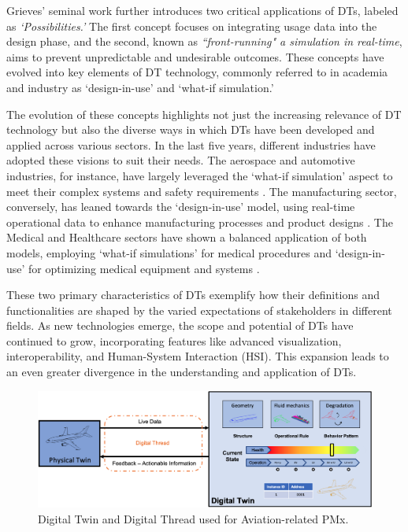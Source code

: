 \documentclass[runningheads]{llncs}
\begin{document}
Grieves' seminal work further introduces two critical applications of DTs, labeled as \textit{`Possibilities.'} The first concept focuses on integrating usage data into the design phase, and the second, known as \textit{``front-running" a simulation in real-time}, aims to prevent unpredictable and undesirable outcomes. These concepts have evolved into key elements of DT technology, commonly referred to in academia and industry as `design-in-use' and `what-if simulation.'

The evolution of these concepts highlights not just the increasing relevance of DT technology but also the diverse ways in which DTs have been developed and applied across various sectors. In the last five years, different industries have adopted these visions to suit their needs. The aerospace and automotive industries, for instance, have largely leveraged the `what-if simulation' aspect to meet their complex systems and safety requirements \cite{ezhilarasu2019management}. The manufacturing sector, conversely, has leaned towards the `design-in-use' model, using real-time operational data to enhance manufacturing processes and product designs \cite{HONGLIM202289}. The Medical and Healthcare sectors have shown a balanced application of both models, employing `what-if simulations' for medical procedures and `design-in-use' for optimizing medical equipment and systems \cite{HALEEM202328}.

These two primary characteristics of DTs exemplify how their definitions and functionalities are shaped by the varied expectations of stakeholders in different fields. As new technologies emerge, the scope and potential of DTs have continued to grow, incorporating features like advanced visualization, interoperability, and Human-System Interaction (HSI). This expansion leads to an even greater divergence in the understanding and application of DTs.


\begin{figure}[h]
    \centering
    \includegraphics[scale=0.2]{Figures/DigitalTwin.png}
    \caption{Digital Twin and Digital Thread used for Aviation-related PMx.}
    \label{fig:DT}
\end{figure}
\end{document}

